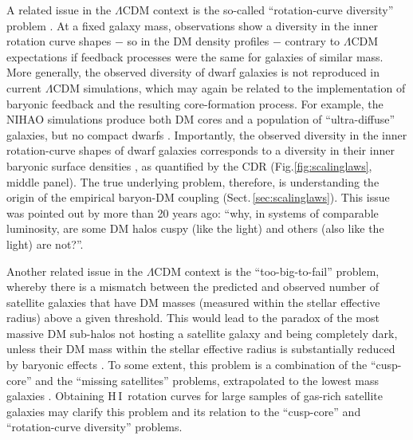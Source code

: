 \documentclass[a4paper,11pt]{article}
\newcommand{\hi } {{\rm H}\,{\small\rm I}}
\begin{document}
A related issue in the $\Lambda$CDM context is the so-called ``rotation-curve diversity'' problem \citep{Oman2015, Ghari2019}. At a fixed galaxy mass, observations show a diversity in the inner rotation curve shapes $-$ so in the DM density profiles $-$ contrary to $\Lambda$CDM expectations if feedback processes were the same for galaxies of similar mass. More generally, the observed diversity of dwarf galaxies is not reproduced in current $\Lambda$CDM simulations, which may again be related to the implementation of baryonic feedback and the resulting core-formation process. For example, the NIHAO simulations produce both DM cores and a population of ``ultra-diffuse'' galaxies, but no compact dwarfs \citep{Jiang2019}. Importantly, the observed diversity in the inner rotation-curve shapes of dwarf galaxies corresponds to a diversity in their inner baryonic surface densities \citep[see][]{Lelli2014b}, as quantified by the CDR (Fig.\ref{fig:scalinglaws}, middle panel). The true underlying problem, therefore, is understanding the origin of the empirical baryon-DM coupling (Sect.\,\ref{sec:scalinglaws}). This issue was pointed out by \citet{Sancisi2004} more than 20 years ago: ``why, in systems of comparable luminosity, are some DM halos cuspy (like the light) and others (also like the light) are not?''.

Another related issue in the $\Lambda$CDM context is the ``too-big-to-fail'' problem, whereby there is a mismatch between the predicted and observed number of satellite galaxies that have DM masses (measured within the stellar effective radius) above a given threshold. This would lead to the paradox of the most massive DM sub-halos not hosting a satellite galaxy and being completely dark, unless their DM mass within the stellar effective radius is substantially reduced by baryonic effects \citep[e.g.,][]{Sales2022}. To some extent, this problem is a combination of the ``cusp-core'' and the ``missing satellites'' problems, extrapolated to the lowest mass galaxies \citep{Bullock2017}. Obtaining \hi\ rotation curves for large samples of gas-rich satellite galaxies may clarify this problem and its relation to the ``cusp-core'' and ``rotation-curve diversity'' problems.
\end{document}
